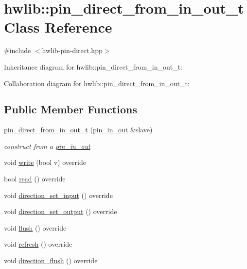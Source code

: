 \hypertarget{classhwlib_1_1pin__direct__from__in__out__t}{}\section{hwlib\+:\+:pin\+\_\+direct\+\_\+from\+\_\+in\+\_\+out\+\_\+t Class Reference}
\label{classhwlib_1_1pin__direct__from__in__out__t}


{\ttfamily \#include $<$hwlib-\/pin-\/direct.\+hpp$>$}



Inheritance diagram for hwlib\+:\+:pin\+\_\+direct\+\_\+from\+\_\+in\+\_\+out\+\_\+t\+:


Collaboration diagram for hwlib\+:\+:pin\+\_\+direct\+\_\+from\+\_\+in\+\_\+out\+\_\+t\+:
\subsection*{Public Member Functions}
\begin{DoxyCompactItemize}
\item 
\mbox{\label{classhwlib_1_1pin__direct__from__in__out__t_a084bd3e73e896f2e6abcecb6283c8e04}} 
\hyperlink{classhwlib_1_1pin__direct__from__in__out__t_a084bd3e73e896f2e6abcecb6283c8e04}{pin\+\_\+direct\+\_\+from\+\_\+in\+\_\+out\+\_\+t} (\hyperlink{classhwlib_1_1pin__in__out}{pin\+\_\+in\+\_\+out} \&slave)
\begin{DoxyCompactList}\small\item\em construct from a \hyperlink{classhwlib_1_1pin__in__out}{pin\+\_\+in\+\_\+out} \end{DoxyCompactList}\item 
void \hyperlink{classhwlib_1_1pin__direct__from__in__out__t_a7ef2a3bd8396c92428e353897ab52442}{write} (bool v) override
\item 
bool \hyperlink{classhwlib_1_1pin__direct__from__in__out__t_a6a77a6c4d2ce69cba2873bdcd087215e}{read} () override
\item 
void \hyperlink{classhwlib_1_1pin__direct__from__in__out__t_a7326f2559461b3efd0fbf1af4fd7fdff}{direction\+\_\+set\+\_\+input} () override
\item 
void \hyperlink{classhwlib_1_1pin__direct__from__in__out__t_a1bd7746b4b114c1ea73d214006fc79bc}{direction\+\_\+set\+\_\+output} () override
\item 
void \hyperlink{classhwlib_1_1pin__direct__from__in__out__t_a4c67e73e0fa9ac4e9a2c5917537eb98a}{flush} () override
\item 
void \hyperlink{classhwlib_1_1pin__direct__from__in__out__t_aa41926363b1f3f0e64ffdbbca5c9aa2f}{refresh} () override
\item 
void \hyperlink{classhwlib_1_1pin__direct__from__in__out__t_ae9704d45e0a75261d126ca0409cda8c2}{direction\+\_\+flush} () override
\end{DoxyCompactItemize}


